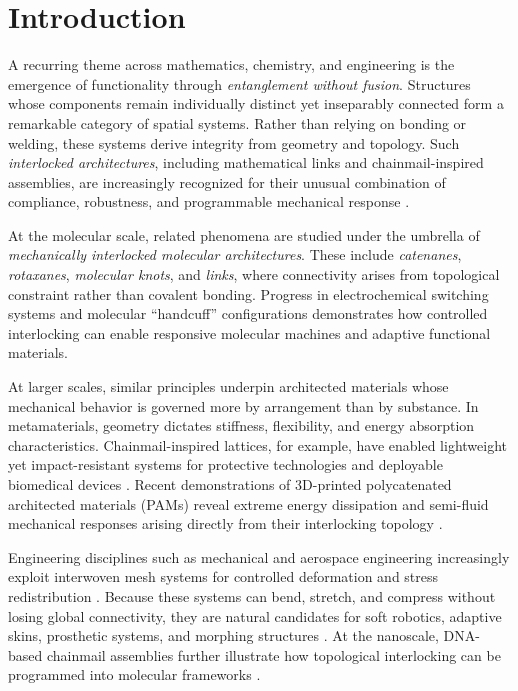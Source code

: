 \documentclass[times,twocolumn,final]{elsarticle}
\begin{document}


\section{Introduction}

A recurring theme across mathematics, chemistry, and engineering is the emergence of functionality through \emph{entanglement without fusion}. Structures whose components remain individually distinct yet inseparably connected form a remarkable category of spatial systems. Rather than relying on bonding or welding, these systems derive integrity from geometry and topology. Such \emph{interlocked architectures}, including mathematical links and chainmail-inspired assemblies, are increasingly recognized for their unusual combination of compliance, robustness, and programmable mechanical response \cite{carlucci2003polycatenation,zhou20253d,cheng20253d,zhang2025recognizing,tang2023chainmail}.

At the molecular scale, related phenomena are studied under the umbrella of \emph{mechanically interlocked molecular architectures}. These include \emph{catenanes}, \emph{rotaxanes}, \emph{molecular knots}, and \emph{links}, where connectivity arises from topological constraint rather than covalent bonding. Progress in electrochemical switching systems \cite{electrochem2024} and molecular ``handcuff'' configurations \cite{handcuffs2022} demonstrates how controlled interlocking can enable responsive molecular machines and adaptive functional materials.

At larger scales, similar principles underpin architected materials whose mechanical behavior is governed more by arrangement than by substance. In metamaterials, geometry dictates stiffness, flexibility, and energy absorption characteristics. Chainmail-inspired lattices, for example, have enabled lightweight yet impact-resistant systems for protective technologies \cite{nature2016interlocked,iass2024parametric} and deployable biomedical devices \cite{pmc2024deployable}. Recent demonstrations of 3D-printed polycatenated architected materials (PAMs) reveal extreme energy dissipation and semi-fluid mechanical responses arising directly from their interlocking topology \cite{popularmechanics2025}.

Engineering disciplines such as mechanical and aerospace engineering increasingly exploit interwoven mesh systems for controlled deformation and stress redistribution \cite{pmc2024deployable}. Because these systems can bend, stretch, and compress without losing global connectivity, they are natural candidates for soft robotics, adaptive skins, prosthetic systems, and morphing structures \cite{arxiv2024chainmail}. At the nanoscale, DNA-based chainmail assemblies further illustrate how topological interlocking can be programmed into molecular frameworks \cite{arxiv2024chainmail}.
\end{document}
